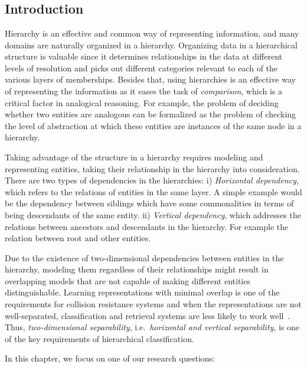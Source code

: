 \chapter{}
\label{chap:3}
\section{Introduction}
Hierarchy is an effective and common way of representing information, and many domains are naturally organized in a hierarchy. Organizing data in a hierarchical structure is valuable since it determines relationships in the data at different levels of resolution and picks out different categories relevant to each of the various layers of memberships.  
Besides that, using hierarchies is an effective way of representing the information as it eases the task of \emph{comparison}, which is a critical factor in analogical reasoning. For example, the problem of deciding whether two entities are analogous can be formalized as the problem of checking the level of abstraction at which these entities are instances of the same node in a hierarchy.

Taking advantage of the structure in a hierarchy requires modeling and representing entities, taking their relationship in the hierarchy into consideration. 
There are two types of dependencies in the hierarchies: i) \emph{Horizontal dependency}, which refers to the relations of entities in the same layer.  A simple example would be the dependency between siblings which have some commonalities in terms of being descendants of the same entity. ii) \emph{Vertical dependency}, which addresses the relations between ancestors and descendants in the hierarchy. For example the relation between root and other entities. 

Due to the existence of two\:-\:dimensional dependencies between entities in the hierarchy, modeling them regardless of their relationships might result in overlapping models that are not capable of making different entities distinguishable.  Learning representations with minimal overlap is one of the requirements for collision resistance systems and when the representations are not well\:-\:separated, classification and retrieval systems are less likely to work well~\citep{Lewis:1992}. 
Thus, \emph{two\:-\:dimensional separability}, i.e.\ \emph{horizontal and vertical separability}, is one of the key requirements of hierarchical classification.

In this chapter, we focus on one of our research questions:

